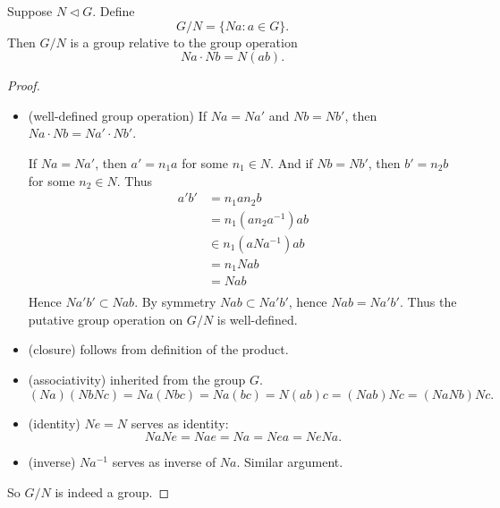\begin{theorem}
	Suppose $N \triangleleft G$. Define \[
		G / N = \{Na: a \in G\} 
	.\] 
	Then $G / N$ is a group relative to the group operation \[
		Na \cdot Nb = N(ab)
	.\] 
\end{theorem}
\begin{proof}
	\begin{itemize}
		\item (well-defined group operation) If $Na = Na'$ and $Nb = Nb'$, then $Na \cdot Nb = Na' \cdot Nb'$.

		If $Na = Na'$, then $a' = n_1a$ for some $n_1\in N$. And if  $Nb=Nb'$, then $b'=n_2b$ for some $n_2\in N$.
		Thus
		\begin{align*}
			a'b'&=n_1an_2b\\
			    &=n_1(an_2a^{-1} )ab \\
			    &\in n_1(aNa^{-1} )ab\\
			    &= n_1Nab \\
			    &= Nab \\
		\end{align*}
		Hence $Na'b'  \subset Nab$. By symmetry $Nab \subset Na'b'$, hence $Nab = Na'b'$. 
		Thus the putative group operation on $ G / N$ is well-defined.

		\item (closure)
		follows from definition of the product.
		\item (associativity)
		inherited from the group $G$. \[
			(Na)(Nb Nc) = Na(Nbc) = Na(bc) = N(ab)c = (Nab)Nc = (Na Nb) Nc
		.\] 
		\item (identity)
			$Ne = N$ serves as identity:
			\[
			Na Ne = Nae = Na = Nea = Ne Na
			.\] 
		\item (inverse)
			$Na^{-1} $ serves as inverse of $Na$. Similar argument.
	\end{itemize}
	So $G / N$ is indeed a group.
\end{proof}

